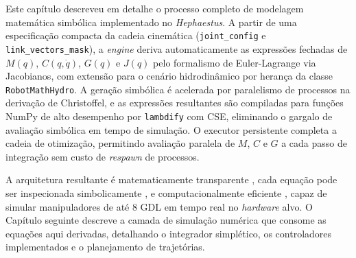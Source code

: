 Este capítulo descreveu em detalhe o processo completo de modelagem matemática simbólica implementado no \textit{Hephaestus}. A partir de uma especificação compacta da cadeia cinemática (\texttt{joint\_config} e \texttt{link\_vectors\_mask}), a \textit{engine} deriva automaticamente as expressões fechadas de $M(q)$, $C(q,\dot{q})$, $G(q)$ e $J(q)$ pelo formalismo de Euler-Lagrange via Jacobianos, com extensão para o cenário hidrodinâmico por herança da classe \texttt{RobotMathHydro}. A geração simbólica é acelerada por paralelismo de processos na derivação de Christoffel, e as expressões resultantes são compiladas para funções NumPy de alto desempenho por \texttt{lambdify} com CSE, eliminando o gargalo de avaliação simbólica em tempo de simulação. O executor persistente completa a cadeia de otimização, permitindo avaliação paralela de $M$, $C$ e $G$ a cada passo de integração sem custo de \textit{respawn} de processos.

A arquitetura resultante é matematicamente transparente , cada equação pode ser inspecionada simbolicamente , e computacionalmente eficiente , capaz de simular manipuladores de até 8 GDL em tempo real no \textit{hardware} alvo. O Capítulo seguinte descreve a camada de simulação numérica que consome as equações aqui derivadas, detalhando o integrador simplético, os controladores implementados e o planejamento de trajetórias.
